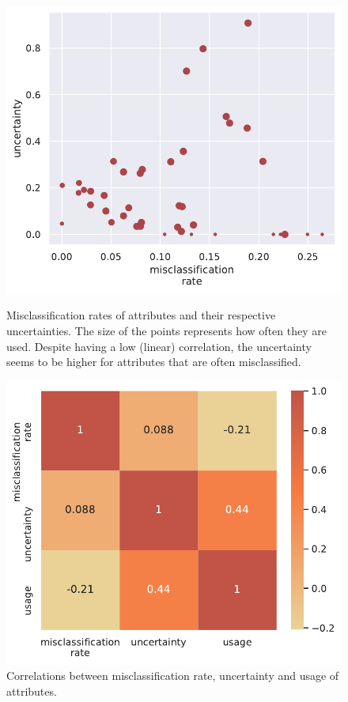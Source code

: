 \documentclass[a4paper,cleardoubleempty,BCOR1cm, 11pt]{report}
\begin{document}
\begin{figure}
	\centering
	\begin{minipage}[t]{0.45\textwidth}
		\centering
		\includegraphics[width=1\textwidth]{images/error_sigma_corr_all.pdf} 
		\caption{Misclassification rates of attributes and their respective uncertainties. The size of the points represents how often they are used. Despite having a low (linear) correlation, the uncertainty seems to be higher for attributes that are often misclassified.}
		\label{fig:correlations}
	\end{minipage}\hfill
	\begin{minipage}[t]{0.45\textwidth}
		\centering
		\includegraphics[width=1\textwidth]{images/corr_matrix.pdf}
		\caption{Correlations between misclassification rate, uncertainty and usage of attributes.}
		\label{fig:corr_matrix}
	\end{minipage}
\end{figure}
\end{document}

